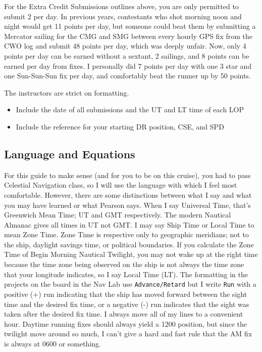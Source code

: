 \documentclass[letterpaper,12pt]{article}
\begin{document}
For the Extra Credit Submissions outlines above, you are only permitted to submit 2 per day.
In previous years, contestants who shot morning noon and night would get 11 points per day, but someone could beat them by submitting a Mercator sailing for the CMG and SMG between every hourly GPS fix from the CWO log and submit 48 points per day, which was deeply unfair.
Now, only 4 points per day can be earned without a sextant, 2 sailings, and 8 points can be earned per day from fixes.
I personally did 7 points per day with one 3 star and one Sun-Sun-Sun fix per day, and comfortably beat the runner up by 50 points.

The instructors are strict on formatting. \begin{itemize}
    \item Include the date of all submissions and the UT and LT time of each LOP
    \item Include the reference for your starting DR position, CSE, and SPD\footnotemark
\end{itemize}
\subsection{Language and Equations}
For this guide to make sense (and for you to be on this cruise), you had to pass Celestial Navigation class, so I will use the language with which I feel most comfortable. However, there are some distinctions between what I say and what you may have learned or what Pearson says. When I say Universal Time, that's Greenwich Mean Time; UT and GMT respectively. The modern Nautical Almanac gives all times in UT not GMT. I may say Ship Time or Local Time to mean Zone Time. Zone Time is respective only to geographic meridians; not to the ship, daylight savings time, or political boundaries. If you calculate the Zone Time of Begin Morning Nautical Twilight, you may not wake up at the right time because the time zone being observed on the ship is not always the time zone that your longitude indicates, so I say Local Time (LT). The formatting in the projects on the board in the Nav Lab use \texttt{Advance/Retard} but I write \texttt{Run} with a positive (+) run indicating that the ship has moved forward between the sight time and the desired fix time, or a negative (-) run indicates that the sight was taken after the desired fix time. I always move all of my lines to a convenient hour. Daytime running fixes should always yield a 1200 position, but since the twilight move around so much, I can't give a hard and fast rule that the AM fix is always at 0600 or something.
\end{document}
